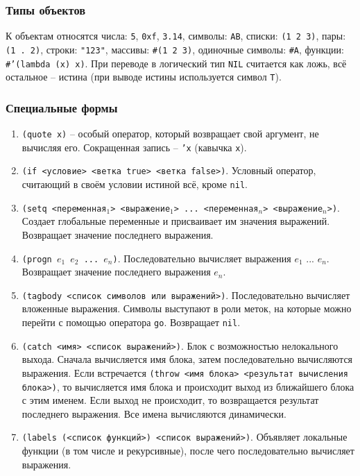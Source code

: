 \subsubsection{Типы объектов}

К объектам относятся числа: \texttt{5}, \texttt{0xf}, \texttt{3.14}, символы: \texttt{AB}, списки: \texttt{(1 2 3)}, пары: \texttt{(1 . 2)}, строки: \texttt{"123"}, массивы: \texttt{\#(1 2 3)}, одиночные символы: \texttt{\#A}, функции: \texttt{\#'(lambda (x) x)}. При переводе в логический тип \texttt{NIL} считается как ложь, всё остальное -- истина (при выводе истины используется символ \texttt{T}).

\subsubsection{Специальные формы}

\begin{enumerate}
\item \texttt{(quote x)} -- особый оператор, который возвращает свой аргумент, не вычисляя его. Сокращенная запись -- \texttt{'x} (кавычка \texttt{x}).
\item \texttt{(if <условие> <ветка true> <ветка false>)}. Условный оператор, считающий в своём условии истиной всё, кроме \texttt{nil}.
\item \texttt{(setq <переменная$_1$> <выражение$_1$> ... <переменная$_n$> <выражение$_n$>)}. Создает глобальные переменные и присваивает им значения выражений. Возвращает значение последнего выражения.
\item \texttt{(progn $e_1$ $e_2$ ... $e_n$)}. Последовательно вычисляет выражения $e_1$ ... $e_n$. Возвращает значение последнего выражения $e_n$.
\item \texttt{(tagbody <список символов или выражений>)}. Последовательно вычисляет вложенные выражения. Символы выступают в роли меток, на которые можно перейти с помощью оператора \texttt{go}. Возвращает \texttt{nil}.
\item \texttt{(catch <имя> <список выражений>)}. Блок с возможностью нелокального выхода. Сначала вычисляется имя блока, затем последовательно вычисляются выражения. Если встречается \texttt{(throw <имя блока> <результат вычисления блока>)}, то вычисляется имя блока и происходит выход из ближайшего блока с этим именем. Если выход не происходит, то возвращается результат последнего выражения. Все имена вычисляются динамически.
\item \texttt{(labels (<список функций>) <список выражений>)}. Объявляет локальные функции (в том числе и рекурсивные), после чего последовательно вычисляет выражения.
\end{enumerate}

